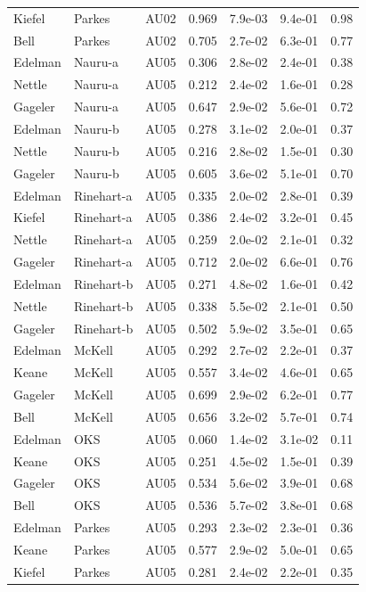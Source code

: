 \documentclass{monashthesis}
\begin{document}
\begin{center}
\begin{longtable}{lllllll}
Kiefel & Parkes & AU02 & 0.969 & 7.9e-03 & 9.4e-01 & 0.98 \\
Bell & Parkes & AU02 & 0.705 & 2.7e-02 & 6.3e-01 & 0.77 \\
Edelman & Nauru-a & AU05 & 0.306 & 2.8e-02 & 2.4e-01 & 0.38 \\
Nettle & Nauru-a & AU05 & 0.212 & 2.4e-02 & 1.6e-01 & 0.28 \\
Gageler & Nauru-a & AU05 & 0.647 & 2.9e-02 & 5.6e-01 & 0.72 \\
Edelman & Nauru-b & AU05 & 0.278 & 3.1e-02 & 2.0e-01 & 0.37 \\
Nettle & Nauru-b & AU05 & 0.216 & 2.8e-02 & 1.5e-01 & 0.30 \\
Gageler & Nauru-b & AU05 & 0.605 & 3.6e-02 & 5.1e-01 & 0.70 \\
Edelman & Rinehart-a & AU05 & 0.335 & 2.0e-02 & 2.8e-01 & 0.39 \\
Kiefel & Rinehart-a & AU05 & 0.386 & 2.4e-02 & 3.2e-01 & 0.45 \\
Nettle & Rinehart-a & AU05 & 0.259 & 2.0e-02 & 2.1e-01 & 0.32 \\
Gageler & Rinehart-a & AU05 & 0.712 & 2.0e-02 & 6.6e-01 & 0.76 \\
Edelman & Rinehart-b & AU05 & 0.271 & 4.8e-02 & 1.6e-01 & 0.42 \\
Nettle & Rinehart-b & AU05 & 0.338 & 5.5e-02 & 2.1e-01 & 0.50 \\
Gageler & Rinehart-b & AU05 & 0.502 & 5.9e-02 & 3.5e-01 & 0.65 \\
Edelman & McKell & AU05 & 0.292 & 2.7e-02 & 2.2e-01 & 0.37 \\
Keane & McKell & AU05 & 0.557 & 3.4e-02 & 4.6e-01 & 0.65 \\
Gageler & McKell & AU05 & 0.699 & 2.9e-02 & 6.2e-01 & 0.77 \\
Bell & McKell & AU05 & 0.656 & 3.2e-02 & 5.7e-01 & 0.74 \\
Edelman & OKS & AU05 & 0.060 & 1.4e-02 & 3.1e-02 & 0.11 \\
Keane & OKS & AU05 & 0.251 & 4.5e-02 & 1.5e-01 & 0.39 \\
Gageler & OKS & AU05 & 0.534 & 5.6e-02 & 3.9e-01 & 0.68 \\
Bell & OKS & AU05 & 0.536 & 5.7e-02 & 3.8e-01 & 0.68 \\
Edelman & Parkes & AU05 & 0.293 & 2.3e-02 & 2.3e-01 & 0.36 \\
Keane & Parkes & AU05 & 0.577 & 2.9e-02 & 5.0e-01 & 0.65 \\
Kiefel & Parkes & AU05 & 0.281 & 2.4e-02 & 2.2e-01 & 0.35 \\

\end{longtable}
\end{center}
\end{document}
